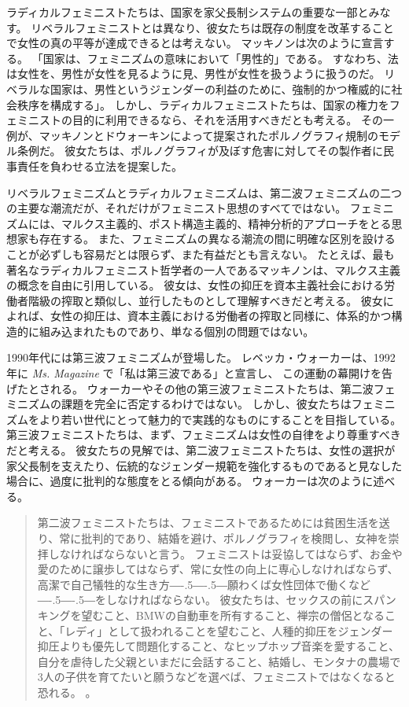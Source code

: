 \documentclass[paper=a4,book,openany]{jlreq}
\def\DDASH{―\kern-.5\zw―\kern-.5\zw―}
\begin{document}
ラディカルフェミニストたちは、国家を家父長制システムの重要な一部とみなす。
リベラルフェミニストとは異なり、彼女たちは既存の制度を改革することで女性の真の平等が達成できるとは考えない。
マッキノンは次のように宣言する。
「国家は、フェミニズムの意味において「男性的」である。
すなわち、法は女性を、男性が女性を見るように見、男性が女性を扱うように扱うのだ。
リベラルな国家は、男性というジェンダーの利益のために、強制的かつ権威的に社会秩序を構成する」\citep[pp.161--162]{mackinnon89:_towar_femin_theor_of_state}。
しかし、ラディカルフェミニストたちは、国家の権力をフェミニストの目的に利用できるなら、それを活用すべきだとも考える。
その一例が、マッキノンとドウォーキンによって提案されたポルノグラフィ規制のモデル条例だ。
彼女たちは、ポルノグラフィが及ぼす危害に対してその製作者に民事責任を負わせる立法を提案した。

リベラルフェミニズムとラディカルフェミニズムは、第二波フェミニズムの二つの主要な潮流だが、それだけがフェミニスト思想のすべてではない。
フェミニズムには、マルクス主義的、ポスト構造主義的、精神分析的アプローチをとる思想家も存在する。
また、フェミニズムの異なる潮流の間に明確な区別を設けることが必ずしも容易だとは限らず、また有益だとも言えない。
たとえば、最も著名なラディカルフェミニスト哲学者の一人であるマッキノンは、マルクス主義の概念を自由に引用している。
彼女は、女性の抑圧を資本主義社会における労働者階級の搾取と類似し、並行したものとして理解すべきだと考える。
彼女によれば、女性の抑圧は、資本主義における労働者の搾取と同様に、体系的かつ構造的に組み込まれたものであり、単なる個別の問題ではない\citep[p.515]{mackinnon82:_femin_marx_meth_stat}。

1990年代には第三波フェミニズムが登場した\citep[cf.][]{snyder08:_what_is_thir_wave_femin}。
レベッカ・ウォーカーは、1992年に \emph{Ms. Magazine} で「私は第三波である」と宣言し\citep{walker92:_becom_thir_wave}、
この運動の幕開けを告げたとされる。
ウォーカーやその他の第三波フェミニストたちは、第二波フェミニズムの課題を完全に否定するわけではない。
しかし、彼女たちはフェミニズムをより若い世代にとって魅力的で実践的なものにすることを目指している。
第三波フェミニストたちは、まず、フェミニズムは女性の自律をより尊重すべきだと考える。
彼女たちの見解では、第二波フェミニストたちは、女性の選択が家父長制を支えたり、伝統的なジェンダー規範を強化するものであると見なした場合に、過度に批判的な態度をとる傾向がある\citep[p.xxii]{hernández02:_colon_this}。
ウォーカーは次のように述べる。

\begin{quote}
  第二波フェミニストたちは、フェミニストであるためには貧困生活を送り、常に批判的であり、結婚を避け、ポルノグラフィを検閲し、女神を崇拝しなければならないと言う。
フェミニストは妥協してはならず、お金や愛のために譲歩してはならず、常に女性の向上に専心しなければならず、高潔で自己犠牲的な生き方{\DDASH}願わくば女性団体で働くなど{\DDASH}をしなければならない。
彼女たちは、セックスの前にスパンキングを望むこと、BMWの自動車を所有すること、禅宗の僧侶となること、「レディ」として扱われることを望むこと、人種的抑圧をジェンダー抑圧よりも優先して問題化すること、なヒップホップ音楽を愛すること、自分を虐待した父親といまだに会話すること、結婚し、モンタナの農場で3人の子供を育てたいと願うなどを選べば、フェミニストではなくなると恐れる。
\citep[p.xxxii]{walker95:_to_be_real}。
\end{quote}
\end{document}
